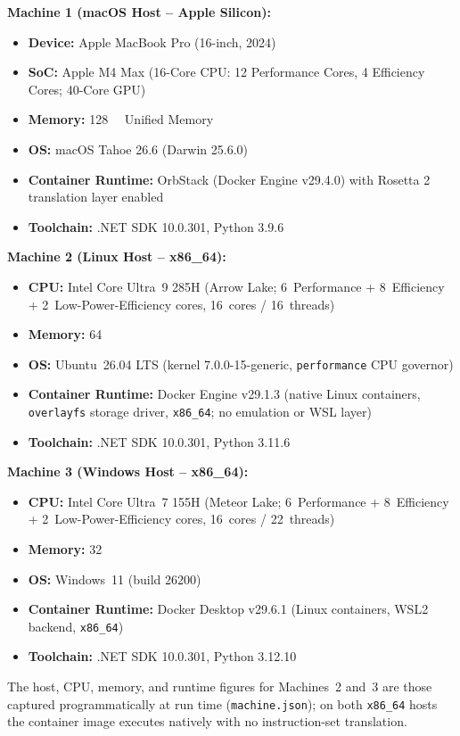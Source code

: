 \textbf{Machine 1 (macOS Host -- Apple Silicon):}
\begin{itemize}
    \item \textbf{Device:} Apple MacBook Pro (16-inch, 2024)
    \item \textbf{SoC:} Apple M4 Max (16-Core CPU: 12 Performance Cores, 4 Efficiency Cores; 40-Core GPU)
    \item \textbf{Memory:} \SI{128}{\giga\byte} Unified Memory
    \item \textbf{OS:} macOS Tahoe 26.6 (Darwin 25.6.0)
    \item \textbf{Container Runtime:} OrbStack (Docker Engine v29.4.0) with Rosetta 2 translation layer enabled
    \item \textbf{Toolchain:} .NET SDK 10.0.301, Python 3.9.6
\end{itemize}

\textbf{Machine 2 (Linux Host -- x86\_64):}
\begin{itemize}
    \item \textbf{CPU:} Intel Core Ultra~9 285H (Arrow Lake; 6~Performance + 8~Efficiency + 2~Low-Power-Efficiency cores, 16~cores / 16~threads)
    \item \textbf{Memory:} \SI{64}{\giga\byte}
    \item \textbf{OS:} Ubuntu~26.04 LTS (kernel 7.0.0-15-generic, \texttt{performance} CPU governor)
    \item \textbf{Container Runtime:} Docker Engine v29.1.3 (native Linux containers, \texttt{overlayfs} storage driver, \texttt{x86\_64}; no emulation or WSL layer)
    \item \textbf{Toolchain:} .NET SDK 10.0.301, Python 3.11.6
\end{itemize}

\textbf{Machine 3 (Windows Host -- x86\_64):}
\begin{itemize}
    \item \textbf{CPU:} Intel Core Ultra~7 155H (Meteor Lake; 6~Performance + 8~Efficiency + 2~Low-Power-Efficiency cores, 16~cores / 22~threads)
    \item \textbf{Memory:} \SI{32}{\giga\byte}
    \item \textbf{OS:} Windows~11 (build 26200)
    \item \textbf{Container Runtime:} Docker Desktop v29.6.1 (Linux containers, WSL2 backend, \texttt{x86\_64})
    \item \textbf{Toolchain:} .NET SDK 10.0.301, Python 3.12.10
\end{itemize}
The host, CPU, memory, and runtime figures for Machines~2 and~3 are those captured programmatically at run time (\texttt{machine.json}); on both \texttt{x86\_64} hosts the container image executes natively with no instruction-set translation.

